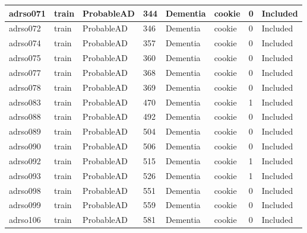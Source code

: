 \begin{center}
\begin{longtable}{|l|l|l|l|l|l|l|l|}
adrso071  & train            & ProbableAD   & 344         & Dementia             & cookie          & 0                & Included      \\ \hline
adrso072  & train            & ProbableAD   & 346         & Dementia             & cookie          & 0                & Included      \\ \hline
adrso074  & train            & ProbableAD   & 357         & Dementia             & cookie          & 0                & Included      \\ \hline
adrso075  & train            & ProbableAD   & 360         & Dementia             & cookie          & 0                & Included      \\ \hline
adrso077  & train            & ProbableAD   & 368         & Dementia             & cookie          & 0                & Included      \\ \hline
adrso078  & train            & ProbableAD   & 369         & Dementia             & cookie          & 0                & Included      \\ \hline
adrso083  & train            & ProbableAD   & 470         & Dementia             & cookie          & 1                & Included      \\ \hline
adrso088  & train            & ProbableAD   & 492         & Dementia             & cookie          & 0                & Included      \\ \hline
adrso089  & train            & ProbableAD   & 504         & Dementia             & cookie          & 0                & Included      \\ \hline
adrso090  & train            & ProbableAD   & 506         & Dementia             & cookie          & 0                & Included      \\ \hline
adrso092  & train            & ProbableAD   & 515         & Dementia             & cookie          & 1                & Included      \\ \hline
adrso093  & train            & ProbableAD   & 526         & Dementia             & cookie          & 1                & Included      \\ \hline
adrso098  & train            & ProbableAD   & 551         & Dementia             & cookie          & 0                & Included      \\ \hline
adrso099  & train            & ProbableAD   & 559         & Dementia             & cookie          & 0                & Included      \\ \hline
adrso106  & train            & ProbableAD   & 581         & Dementia             & cookie          & 0                & Included      \\ \hline

\end{longtable}
\end{center}
